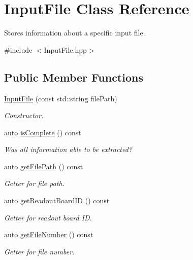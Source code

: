 \hypertarget{class_input_file}{}\section{Input\+File Class Reference}
\label{class_input_file}


Stores information about a specific input file.  




{\ttfamily \#include $<$Input\+File.\+hpp$>$}

\subsection*{Public Member Functions}
\begin{DoxyCompactItemize}
\item 
\hyperlink{class_input_file_a36704203477e78e7de3ff4b98276e3a6}{Input\+File} (const std\+::string file\+Path)
\begin{DoxyCompactList}\small\item\em Constructor. \end{DoxyCompactList}\item 
auto \hyperlink{class_input_file_a65406d6a016391c2cccb0e6e4ee08099}{is\+Complete} () const
\begin{DoxyCompactList}\small\item\em Was all information able to be extracted? \end{DoxyCompactList}\item 
auto \hyperlink{class_input_file_a2e3685bddcae984f458e7fc6a20e7a44}{get\+File\+Path} () const
\begin{DoxyCompactList}\small\item\em Getter for file path. \end{DoxyCompactList}\item 
auto \hyperlink{class_input_file_a96c696bb882f54671ad897501440fd17}{get\+Readout\+Board\+ID} () const
\begin{DoxyCompactList}\small\item\em Getter for readout board ID. \end{DoxyCompactList}\item 
auto \hyperlink{class_input_file_a1a1a9c0d87f77e580e03da608b1b5291}{get\+File\+Number} () const
\begin{DoxyCompactList}\small\item\em Getter for file number. \end{DoxyCompactList}\item 

\end{DoxyCompactItemize}
